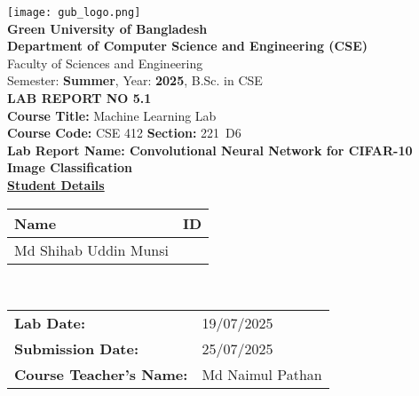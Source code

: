 \documentclass[12pt]{article}
\begin{document}
\begin{center}
    \texttt{[image: gub\_logo.png]}\\[3em]
    \textbf{\Large Green University of Bangladesh}\\[0.5em]
    \textbf{Department of Computer Science and Engineering (CSE)}\\[0.5em]
    Faculty of Sciences and Engineering\\
    Semester: \textbf{Summer}, Year: \textbf{2025}, B.Sc. in CSE\\[1.5em]
    \textbf{\Large LAB REPORT NO 5.1}\\[1em]
    \textbf{Course Title:} Machine Learning Lab\\
    \textbf{Course Code:} CSE 412 \hspace{1cm} \textbf{Section:} 221\ D6\\[2em]
    \textbf{Lab Report Name: Convolutional Neural Network for CIFAR-10 Image Classification}\\[2em]
    \textbf{\underline{Student Details}}\\[0.5em]
    \begin{tabular}{|>{\centering\arraybackslash}m{6cm}|>{\centering\arraybackslash}m{6cm}|}
        \hline
        \textbf{Name} & \textbf{ID} \\
        \hline
        Md Shihab Uddin Munsi & 212002054 \\
        \hline
    \end{tabular}\\[2em]
    \begin{tabular}{ll}
        \textbf{Lab Date:} & 19/07/2025\\
        \textbf{Submission Date:} & 25/07/2025 \\
        \textbf{Course Teacher's Name:} & Md Naimul Pathan \\
    \end{tabular}\\[2em]
\end{center}
\end{document}
